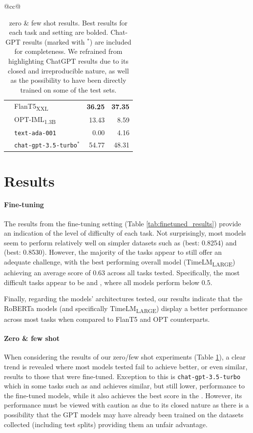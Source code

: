 \begin{table}[t]
{\begin{tabular}{@{}cc@{}}
\begin{tabular}{llrr}
 & FlanT5\textsubscript{XXL} & \textbf{36.25} & \textbf{37.35} \\
 & OPT-IML\textsubscript{1.3B} & 13.43 & 8.59 \\
 & \texttt{text-ada-001} & 0.00 & 4.16 \\
 & \texttt{chat-gpt-3.5-turbo$^*$} & 54.77 & 48.31 \\
\end{tabular}
\end{tabular}
} %
\caption{{\DATASET} zero \& few shot results. Best results for each task and setting are bolded. Chat-GPT results (marked with $^*$) are included for completeness. We refrained from highlighting ChatGPT results due to its closed and irreproducible nature, as well as the possibility to have been directly trained on some of the test sets.}
\label{tab:zerofew_results}
\end{table}



\section{Results}

\paragraph{Fine-tuning}

The results from the fine-tuning setting  (Table \ref{tab:finetuned_results}) provide an indication of the level of difficulty of each task. Not surprisingly, most models seem to perform relatively well on simpler datasets such as {\TweetHate} (best: 0.8254) and {\TweetNERD} (best: 0.8530). However, the majority of the tasks appear to still offer an adequate challenge, with the best performing overall model (TimeLM\textsubscript{LARGE}) achieving an average score of 0.63 across all tasks tested. Specifically, the most difficult tasks appear to be {\TweetEmoji} and {\TweetQG}, where all models perform below 0.5.

Finally, regarding the models' architectures tested, our results indicate that the RoBERTa models (and specifically TimeLM\textsubscript{LARGE}) display a better performance across most tasks when compared to FlanT5 and OPT counterparts.


\paragraph{Zero \& few shot}
When considering the results of our zero/few shot experiments (Table \ref{tab:zerofew_results}), a clear trend is revealed where most models tested fail to achieve better, or even similar, results to those that were fine-tuned. Exception to this is \texttt{chat-gpt-3.5-turbo} which in some tasks such as {\TempoWiC} and {\TweetNERD} achieves similar, but still lower, performance to the fine-tuned models, while it also achieves the best score in the {\TweetQA}. However, its performance must be viewed with caution as due to its closed nature as there is a possibility that the GPT models may have already been trained on the datasets collected (including test splits) providing them an unfair advantage.

